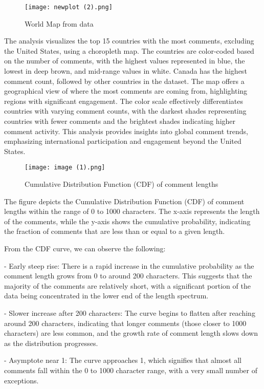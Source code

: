 \documentclass[sigconf]{acmart}
\begin{document}
\begin{figure}[h]
    \texttt{[image: newplot (2).png]}
    \caption{World Map from data}
    \label{fig:daily_submissions}
\end{figure}
The analysis visualizes the top 15 countries with the most comments, excluding the United States, using a choropleth map. The countries are color-coded based on the number of comments, with the highest values represented in blue, the lowest in deep brown, and mid-range values in white. Canada has the highest comment count, followed by other countries in the dataset. The map offers a geographical view of where the most comments are coming from, highlighting regions with significant engagement. The color scale effectively differentiates countries with varying comment counts, with the darkest shades representing countries with fewer comments and the brightest shades indicating higher comment activity. This analysis provides insights into global comment trends, emphasizing international participation and engagement beyond the United States.


\begin{figure}[h]
    \texttt{[image: image (1).png]}
    \caption{Cumulative Distribution Function (CDF) of comment lengths}
    \label{fig:hourly_comments}
\end{figure}
    The figure depicts the Cumulative Distribution Function (CDF) of comment lengths within the range of 0 to 1000 characters. The x-axis represents the length of the comments, while the y-axis shows the cumulative probability, indicating the fraction of comments that are less than or equal to a given length.

From the CDF curve, we can observe the following:

- Early steep rise: There is a rapid increase in the cumulative probability as the comment length grows from 0 to around 200 characters. This suggests that the majority of the comments are relatively short, with a significant portion of the data being concentrated in the lower end of the length spectrum.
  
- Slower increase after 200 characters: The curve begins to flatten after reaching around 200 characters, indicating that longer comments (those closer to 1000 characters) are less common, and the growth rate of comment length slows down as the distribution progresses.

- Asymptote near 1: The curve approaches 1, which signifies that almost all comments fall within the 0 to 1000 character range, with a very small number of exceptions.
\end{document}
